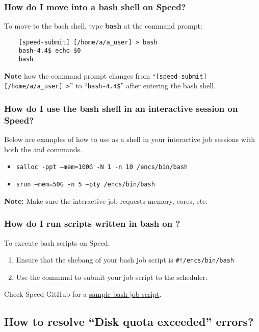 \subsubsection{How do I move into a bash shell on Speed?}
To move to the bash shell, type \textbf{bash} at the command prompt:
\begin{verbatim}
	[speed-submit] [/home/a/a_user] > bash
	bash-4.4$ echo $0
	bash
\end{verbatim}
\noindent\textbf{Note} how the command prompt changes from
``\verb![speed-submit] [/home/a/a_user] >!'' to ``\verb!bash-4.4$!'' after entering the bash shell.

\subsubsection{How do I use the bash shell in an interactive session on Speed?}
Below are examples of how to use  as a shell in your interactive job sessions
with both the  and  commands.
\begin{itemize}
	\item \texttt{salloc -ppt --mem=100G -N 1 -n 10 /encs/bin/bash}
	\item \texttt{srun --mem=50G -n 5 --pty /encs/bin/bash}
\end{itemize}
\noindent\textbf{Note:} Make sure the interactive job requests memory, cores, etc.

\subsubsection{How do I run scripts written in bash on ?}
To execute bash scripts on Speed:
\begin{enumerate}
	\item Ensure that the shebang of your bash job script is \verb+#!/encs/bin/bash+
	\item Use the  command to submit your job script to the scheduler.
\end{enumerate}
\noindent Check Speed GitHub for a \href{https://github.com/NAG-DevOps/speed-hpc/blob/master/src/bash.sh}{sample bash job script}.

\subsection{How to resolve ``Disk quota exceeded'' errors?}
\label{sect:quota-exceeded}

